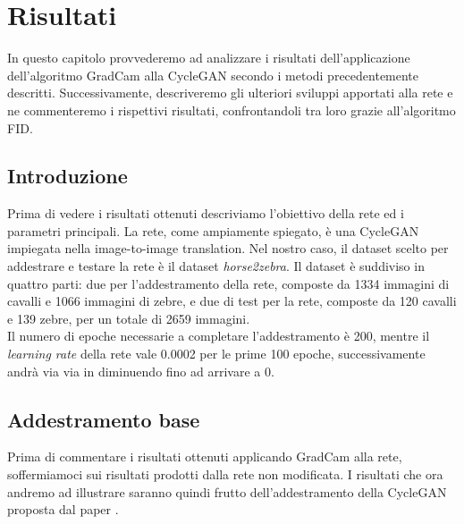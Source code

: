 \chapter{Risultati}
In questo capitolo provvederemo ad analizzare i risultati dell'applicazione dell'algoritmo GradCam alla CycleGAN secondo i metodi precedentemente descritti. Successivamente, descriveremo gli ulteriori sviluppi apportati alla rete e ne commenteremo i rispettivi risultati, confrontandoli tra loro grazie all'algoritmo FID.

\section{Introduzione}
Prima di vedere i risultati ottenuti descriviamo l'obiettivo della rete ed i parametri principali. La rete, come ampiamente spiegato, è una CycleGAN impiegata nella image-to-image translation. Nel nostro caso, il dataset scelto per addestrare e testare la rete è il dataset \emph{horse2zebra}. Il dataset è suddiviso in quattro parti: due per l'addestramento della rete, composte da 1334 immagini di cavalli e 1066 immagini di zebre, e due di test per la rete, composte da 120 cavalli e 139 zebre, per un totale di 2659 immagini.
\\Il numero di epoche necessarie a completare l'addestramento è 200, mentre il \emph{learning rate} della rete vale 0.0002 per le prime 100 epoche, successivamente andrà via via in diminuendo fino ad arrivare a 0.


\section{Addestramento base}
Prima di commentare i risultati ottenuti applicando GradCam alla rete, soffermiamoci sui risultati prodotti dalla rete non modificata. I risultati che ora andremo ad illustrare saranno quindi frutto dell'addestramento della CycleGAN proposta dal paper \cite{Zhu_2017_ICCV}. 

